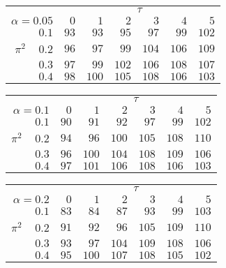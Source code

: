 \begin{tabular}{r|rrrrrr}
\hline\hline
 &\multicolumn{6}{c}{$\tau$} \\ 
 $\alpha = 0.05$ & $0$ & $1$ & $2$ & $3$ & $4$ & $5$ \\ 
 \hline$0.1$ & $ 93$ & $ 93$ & $ 95$ & $ 97$ & $ 99$ & $102$\\ 
$\pi^2\;\;\;$ $0.2$ & $ 96$ & $ 97$ & $ 99$ & $104$ & $106$ & $109$\\ 
$0.3$ & $ 97$ & $ 99$ & $102$ & $106$ & $108$ & $107$\\ 
$0.4$ & $ 98$ & $100$ & $105$ & $108$ & $106$ & $103$\\ 
 \hline 
 \end{tabular}
 
 \vspace{2em} 
 
\begin{tabular}{r|rrrrrr}
\hline\hline
 &\multicolumn{6}{c}{$\tau$} \\ 
 $\alpha = 0.1$ & $0$ & $1$ & $2$ & $3$ & $4$ & $5$ \\ 
 \hline$0.1$ & $ 90$ & $ 91$ & $ 92$ & $ 97$ & $ 99$ & $102$\\ 
$\pi^2\;\;\;$ $0.2$ & $ 94$ & $ 96$ & $100$ & $105$ & $108$ & $110$\\ 
$0.3$ & $ 96$ & $100$ & $104$ & $108$ & $109$ & $106$\\ 
$0.4$ & $ 97$ & $101$ & $106$ & $108$ & $106$ & $103$\\ 
 \hline 
 \end{tabular}
 
 \vspace{2em} 
 
\begin{tabular}{r|rrrrrr}
\hline\hline
 &\multicolumn{6}{c}{$\tau$} \\ 
 $\alpha = 0.2$ & $0$ & $1$ & $2$ & $3$ & $4$ & $5$ \\ 
 \hline$0.1$ & $ 83$ & $ 84$ & $ 87$ & $ 93$ & $ 99$ & $103$\\ 
$\pi^2\;\;\;$ $0.2$ & $ 91$ & $ 92$ & $ 96$ & $105$ & $109$ & $110$\\ 
$0.3$ & $ 93$ & $ 97$ & $104$ & $109$ & $108$ & $106$\\ 
$0.4$ & $ 95$ & $100$ & $107$ & $108$ & $105$ & $102$\\ 
 \hline 
 \end{tabular}
